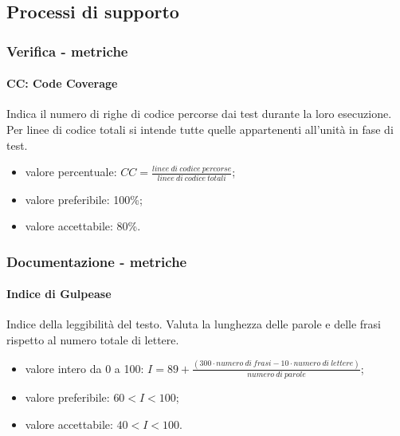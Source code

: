 	\subsection{Processi di supporto}
		\subsubsection{Verifica - metriche}
		\paragraph{CC: Code Coverage}
		Indica il numero di righe di codice percorse dai test durante la loro esecuzione. Per linee di codice totali si intende tutte quelle appartenenti all'unità in fase di test.
		\begin{itemize}
		\item valore percentuale: $CC = \frac{linee \ di \ codice \ percorse}{linee \ di \ codice \ totali}$;
		\item valore preferibile: 100\%;
		\item valore accettabile: 80\%.
		\end{itemize}
		
		\subsubsection{Documentazione - metriche}
		\paragraph{Indice di Gulpease}
		Indice della leggibilità del testo. Valuta la lunghezza delle parole e delle frasi rispetto al numero totale di lettere.
		\begin{itemize}
		\item valore intero da 0 a 100: $I = 89 + \frac{(300 \cdot numero \ di \ frasi - 10 \cdot numero \ di \ lettere)}{numero \ di \ parole}$;
		\item valore preferibile: $60 < I < 100$;
		\item valore accettabile: $40 < I < 100$.
		\end{itemize}
		
		\newpage
		\setcounter{table}{0}
